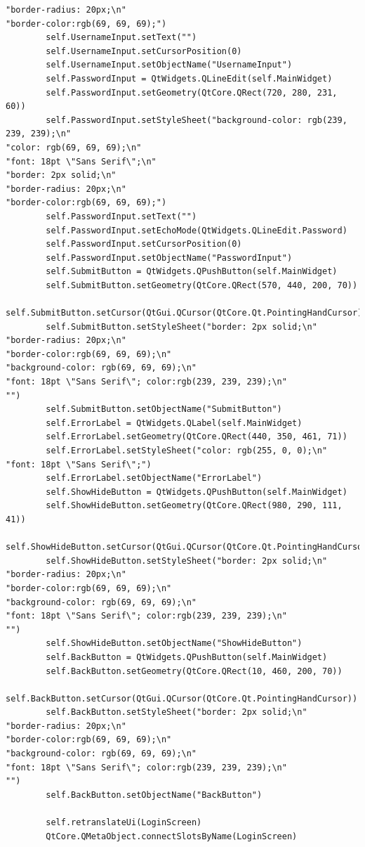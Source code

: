 \documentclass[12pt]{article}
\begin{document}
\begin{lstlisting}
"border-radius: 20px;\n"
"border-color:rgb(69, 69, 69);")
        self.UsernameInput.setText("")
        self.UsernameInput.setCursorPosition(0)
        self.UsernameInput.setObjectName("UsernameInput")
        self.PasswordInput = QtWidgets.QLineEdit(self.MainWidget)
        self.PasswordInput.setGeometry(QtCore.QRect(720, 280, 231, 60))
        self.PasswordInput.setStyleSheet("background-color: rgb(239, 239, 239);\n"
"color: rgb(69, 69, 69);\n"
"font: 18pt \"Sans Serif\";\n"
"border: 2px solid;\n"
"border-radius: 20px;\n"
"border-color:rgb(69, 69, 69);")
        self.PasswordInput.setText("")
        self.PasswordInput.setEchoMode(QtWidgets.QLineEdit.Password)
        self.PasswordInput.setCursorPosition(0)
        self.PasswordInput.setObjectName("PasswordInput")
        self.SubmitButton = QtWidgets.QPushButton(self.MainWidget)
        self.SubmitButton.setGeometry(QtCore.QRect(570, 440, 200, 70))
        self.SubmitButton.setCursor(QtGui.QCursor(QtCore.Qt.PointingHandCursor))
        self.SubmitButton.setStyleSheet("border: 2px solid;\n"
"border-radius: 20px;\n"
"border-color:rgb(69, 69, 69);\n"
"background-color: rgb(69, 69, 69);\n"
"font: 18pt \"Sans Serif\"; color:rgb(239, 239, 239);\n"
"")
        self.SubmitButton.setObjectName("SubmitButton")
        self.ErrorLabel = QtWidgets.QLabel(self.MainWidget)
        self.ErrorLabel.setGeometry(QtCore.QRect(440, 350, 461, 71))
        self.ErrorLabel.setStyleSheet("color: rgb(255, 0, 0);\n"
"font: 18pt \"Sans Serif\";")
        self.ErrorLabel.setObjectName("ErrorLabel")
        self.ShowHideButton = QtWidgets.QPushButton(self.MainWidget)
        self.ShowHideButton.setGeometry(QtCore.QRect(980, 290, 111, 41))
        self.ShowHideButton.setCursor(QtGui.QCursor(QtCore.Qt.PointingHandCursor))
        self.ShowHideButton.setStyleSheet("border: 2px solid;\n"
"border-radius: 20px;\n"
"border-color:rgb(69, 69, 69);\n"
"background-color: rgb(69, 69, 69);\n"
"font: 18pt \"Sans Serif\"; color:rgb(239, 239, 239);\n"
"")
        self.ShowHideButton.setObjectName("ShowHideButton")
        self.BackButton = QtWidgets.QPushButton(self.MainWidget)
        self.BackButton.setGeometry(QtCore.QRect(10, 460, 200, 70))
        self.BackButton.setCursor(QtGui.QCursor(QtCore.Qt.PointingHandCursor))
        self.BackButton.setStyleSheet("border: 2px solid;\n"
"border-radius: 20px;\n"
"border-color:rgb(69, 69, 69);\n"
"background-color: rgb(69, 69, 69);\n"
"font: 18pt \"Sans Serif\"; color:rgb(239, 239, 239);\n"
"")
        self.BackButton.setObjectName("BackButton")

        self.retranslateUi(LoginScreen)
        QtCore.QMetaObject.connectSlotsByName(LoginScreen)


\end{lstlisting}
\end{document}
